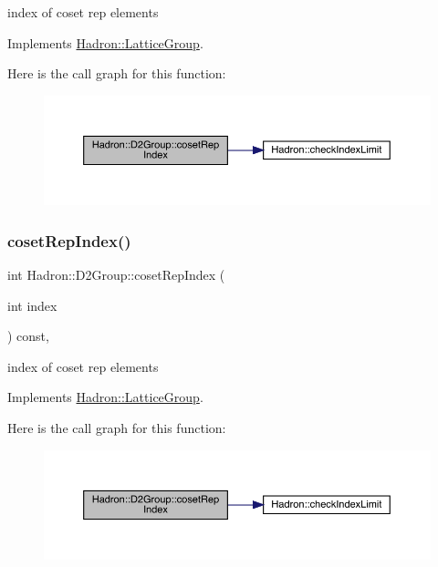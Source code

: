 index of coset rep elements 

Implements \mbox{\hyperlink{structHadron_1_1LatticeGroup_a7e3b9b5e2f596e6c40d64aa939a3ad6c}{Hadron\+::\+Lattice\+Group}}.

Here is the call graph for this function\+:
\nopagebreak
\begin{figure}[H]
\begin{center}
\leavevmode
\includegraphics[width=350pt]{d8/de7/structHadron_1_1D2Group_a41bfcefe5a659b99db790f822123593f_cgraph}
\end{center}
\end{figure}
\mbox{\label{structHadron_1_1D2Group_a41bfcefe5a659b99db790f822123593f}} 
\subsubsection{\texorpdfstring{cosetRepIndex()}{cosetRepIndex()}\hspace{0.1cm}{\footnotesize\ttfamily [3/3]}}
{\footnotesize\ttfamily int Hadron\+::\+D2\+Group\+::coset\+Rep\+Index (\begin{DoxyParamCaption}\item[{int}]{index }\end{DoxyParamCaption}) const\hspace{0.3cm}{\ttfamily [inline]}, {\ttfamily [virtual]}}

index of coset rep elements 

Implements \mbox{\hyperlink{structHadron_1_1LatticeGroup_a7e3b9b5e2f596e6c40d64aa939a3ad6c}{Hadron\+::\+Lattice\+Group}}.

Here is the call graph for this function\+:
\nopagebreak
\begin{figure}[H]
\begin{center}
\leavevmode
\includegraphics[width=350pt]{d8/de7/structHadron_1_1D2Group_a41bfcefe5a659b99db790f822123593f_cgraph}
\end{center}
\end{figure}
\mbox{\label{structHadron_1_1D2Group_a937ab7d9b4b21da1331b0c85728f7db9}} 
